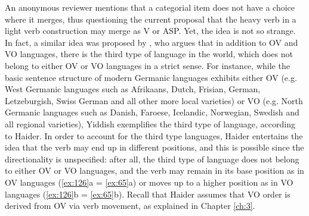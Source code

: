 \ea\label{ex:125}
    \ea {}
    \ex{}
    \z
\z

An anonymous reviewer mentions that a categorial item does not have a choice where it merges, thus questioning the current proposal that the heavy verb in a light verb construction may merge as V or \ac{ASP}. Yet, the idea is not so strange. In fact, a similar idea was proposed by \citet{Haider2013}, who argues that in addition to \ac{OV} and \ac{VO} languages, there is the third type of language in the world, which does not belong to either \ac{OV} or \ac{VO} languages in a strict sense. For instance, while the basic sentence structure of modern Germanic languages exhibits either \ac{OV} (e.g. West Germanic languages such as Afrikaans, Dutch, Frisian, German, Letzeburgish, Swiss German and all other more local varieties) or \ac{VO} (e.g. North Germanic languages such as Danish, Faroese, Icelandic, Norwegian, Swedish and all regional varieties), Yiddish exemplifies the third type of language, according to Haider. In order to account for the third type languages, Haider entertains the idea that the verb may end up in different positions, and this is possible since the directionality is unspecified: after all, the third type of language does not belong to either \ac{OV} or \ac{VO} languages, and the verb may remain in its base position as in \ac{OV} languages (\ref{ex:126}a = \ref{ex:65}a) or moves up to a higher position as in \ac{VO} languages (\ref{ex:126}b = \ref{ex:65}b). Recall that Haider assumes that \ac{VO} order is derived from \ac{OV} via verb movement, as explained in Chapter \ref{ch:3}. 

